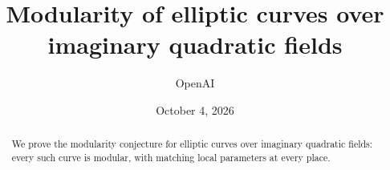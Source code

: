 \documentclass[11pt]{article}
\title{Modularity of elliptic curves over imaginary quadratic fields}
\author{OpenAI}
\date{October 4, 2026}
\numberwithin{equation}{section}
\theoremstyle{definition}
\begin{document}
\maketitle
\begin{abstract}
We prove the modularity conjecture for elliptic curves over imaginary
quadratic fields: every such curve is modular, with matching local
parameters at every place.
\end{abstract}











\end{document}
